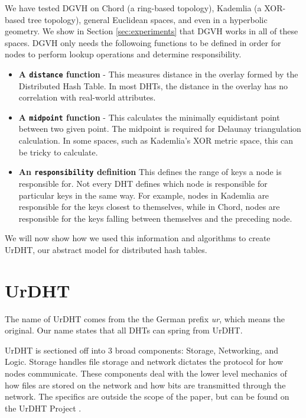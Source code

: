 \documentclass[11pt,conference]{IEEEtran}
\begin{document}
We have tested DGVH on Chord (a ring-based topology), Kademlia (a XOR-based tree topology), general Euclidean spaces, and even in a hyperbolic geometry.
We show in Section \ref{sec:experiments} that DGVH works in all of these spaces.
DGVH only needs the followoing functions to be defined in order for nodes to perform lookup operations and determine responsibility.

\begin{itemize}
	\item \textbf{A \texttt{distance} function } - This measures distance in the overlay formed by the Distributed Hash Table.
	In most DHTs, the distance in the overlay has no correlation with real-world attributes.
	
	\item \textbf{A \texttt{midpoint} function} - This calculates the minimally equidistant point between two given point.
	The midpoint is required for Delaunay triangulation calculation.
	In some spaces, such as Kademlia's XOR metric space, this can be tricky to calculate.  %
	\item \textbf{An \texttt{responsibility} definition}  This defines the range of keys a node is responsible for. 
	Not every DHT defines which node is responsible for particular keys in the same way. 
	For example, nodes in Kademlia are responsible for the keys closest to themselves, while in Chord, nodes are responsible for the keys falling between themselves and the preceding node.
\end{itemize}

We will now show how we used this information and algorithms to create UrDHT, our abstract model for  distributed hash tables.




\section{UrDHT}
\label{sec:urdht}


The name of UrDHT comes from the the German prefix \textit{ur}, which means the original. 
Our name states that all DHTs can spring from UrDHT.

UrDHT is sectioned off into 3 broad components: Storage, Networking, and Logic.
Storage handles file storage and network dictates the protocol for how nodes communicate.
These components deal with the lower level mechanics of how files are stored on the network and how bits are transmitted through the network.
The specifics are outside the scope of the paper, but can be found on the UrDHT Project \cite{urdht}.
\end{document}
